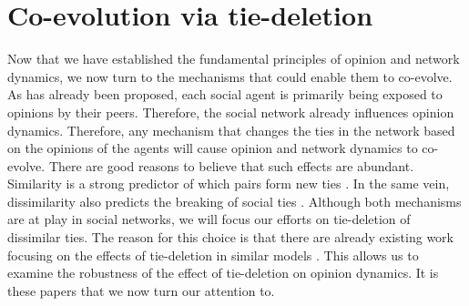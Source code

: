 \documentclass{article}
\begin{document}
\section{Co-evolution via tie-deletion}
Now that we have established the fundamental principles of opinion and network dynamics, we now turn to the mechanisms that could enable them to co-evolve. As has already been proposed, each social agent is primarily being exposed to opinions by their peers. Therefore, the social network already influences opinion dynamics. Therefore, any mechanism that changes the ties in the network based on the opinions of the agents will cause opinion and network dynamics to co-evolve. There are good reasons to believe that such effects are abundant. Similarity is a strong predictor of which pairs form new ties \cite{bener_empirical_2016,kossinets_origins_2009}. In the same vein, dissimilarity also predicts the breaking of social ties \cite{bener_empirical_2016,kossinets_origins_2009,levin_dynamics_2021}. Although both mechanisms are at play in social networks, we will focus our efforts on tie-deletion of dissimilar ties. The reason for this choice is that there are already existing work focusing on the effects of tie-deletion in similar models \cite{santos_cooperation_2006,sasahara_social_2021}. This allows us to examine the robustness of the effect of tie-deletion on opinion dynamics. It is these papers that we now turn our attention to.  
\end{document}
